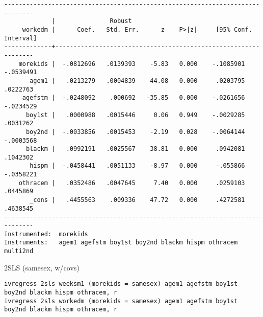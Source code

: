 \documentclass[11pt]{article}
\begin{document}
\begin{verbatim}
------------------------------------------------------------------------------
             |               Robust
     workedm |      Coef.   Std. Err.      z    P>|z|     [95% Conf. Interval]
-------------+----------------------------------------------------------------
    morekids |  -.0812696   .0139393    -5.83   0.000    -.1085901   -.0539491
       agem1 |   .0213279   .0004839    44.08   0.000     .0203795    .0222763
     agefstm |  -.0248092    .000692   -35.85   0.000    -.0261656   -.0234529
      boy1st |   .0000988   .0015446     0.06   0.949    -.0029285    .0031262
      boy2nd |  -.0033856   .0015453    -2.19   0.028    -.0064144   -.0003568
      blackm |   .0992191   .0025567    38.81   0.000     .0942081    .1042302
       hispm |  -.0458441   .0051133    -8.97   0.000     -.055866   -.0358221
    othracem |   .0352486   .0047645     7.40   0.000     .0259103    .0445869
       _cons |   .4455563    .009336    47.72   0.000     .4272581    .4638545
------------------------------------------------------------------------------
Instrumented:  morekids
Instruments:   agem1 agefstm boy1st boy2nd blackm hispm othracem multi2nd
\end{verbatim}

2SLS (samesex, w/covs)
\begin{verbatim}
ivregress 2sls weeksm1 (morekids = samesex) agem1 agefstm boy1st boy2nd blackm hispm othracem, r
ivregress 2sls workedm (morekids = samesex) agem1 agefstm boy1st boy2nd blackm hispm othracem, r
\end{verbatim}
\end{document}
